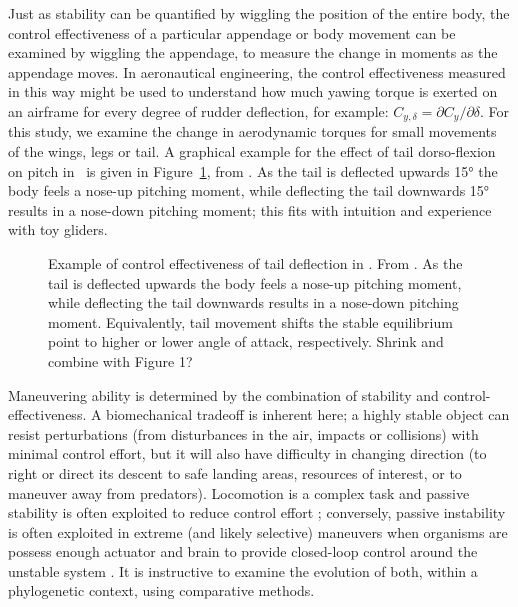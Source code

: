 Just as stability can be quantified by wiggling the position of the entire body, the control effectiveness of a particular appendage or body movement can be examined by wiggling the appendage, to measure the change in moments as the appendage moves.  In aeronautical engineering, the control effectiveness measured in this way might be used to understand how much yawing torque is exerted on an airframe for every degree of rudder deflection, for example: $C_{y,\delta} = \partial C_y / \partial \delta$.  For this study, we examine the change in aerodynamic torques for small movements of the wings, legs or tail. A graphical example for the effect of tail dorso-flexion on pitch in \Microraptor\ is given in Figure~\ref{fig:microraptor-tail-example}, from \cite{Tisbe:2011, Koehl:2011}.  As the tail is deflected upwards \ang{15} the body feels a nose-up pitching moment, while deflecting the tail downwards \ang{15} results in a nose-down pitching moment; this fits with intuition and experience with toy gliders.   
\begin{figure}[!ht]
\begin{center}
\end{center}
\caption{
{ Example of control effectiveness of tail deflection in \Microraptor.}  From \cite{Tisbe:2011, Koehl:2011}. As the tail is deflected upwards the body feels a nose-up pitching moment, while deflecting the tail downwards results in a nose-down pitching moment.  Equivalently, tail movement shifts the stable equilibrium point to higher or lower angle of attack, respectively.  Shrink and combine with Figure 1? }
\label{fig:microraptor-tail-example}
\end{figure}

Maneuvering ability is determined by the combination of stability and control-effectiveness.  A biomechanical tradeoff is inherent here; a highly stable object can resist perturbations (from disturbances in the air, impacts or collisions) with minimal control effort, but it will also have difficulty in changing direction (to right or direct its descent to safe landing areas, resources of interest, or to maneuver away from predators).  Locomotion is a complex task and passive stability is often exploited to reduce control effort \cite{someone}; conversely, passive instability is often exploited in extreme (and likely selective) maneuvers when organisms are possess enough actuator and brain to provide closed-loop control around the unstable system \cite{someone}.  It is instructive to examine the evolution of both, within a phylogenetic context, using comparative methods. 

